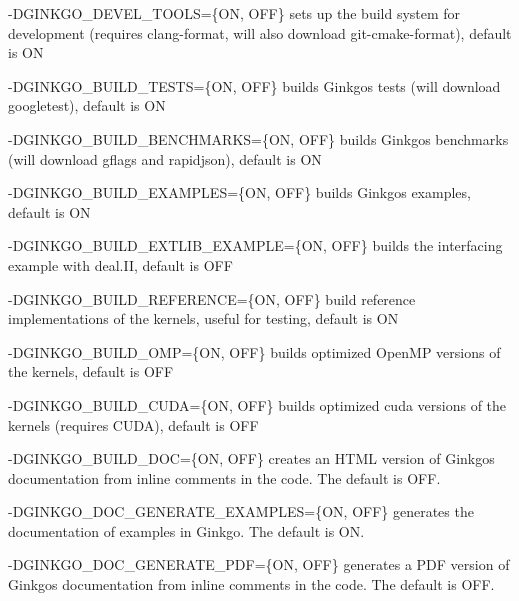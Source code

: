\begin{DoxyItemize}
\item {\ttfamily -\/\+D\+G\+I\+N\+K\+G\+O\+\_\+\+D\+E\+V\+E\+L\+\_\+\+T\+O\+O\+LS=\{ON, O\+FF\}} sets up the build system for development (requires clang-\/format, will also download git-\/cmake-\/format), default is {\ttfamily ON}
\item {\ttfamily -\/\+D\+G\+I\+N\+K\+G\+O\+\_\+\+B\+U\+I\+L\+D\+\_\+\+T\+E\+S\+TS=\{ON, O\+FF\}} builds Ginkgo\textquotesingle{}s tests (will download googletest), default is {\ttfamily ON}
\item {\ttfamily -\/\+D\+G\+I\+N\+K\+G\+O\+\_\+\+B\+U\+I\+L\+D\+\_\+\+B\+E\+N\+C\+H\+M\+A\+R\+KS=\{ON, O\+FF\}} builds Ginkgo\textquotesingle{}s benchmarks (will download gflags and rapidjson), default is {\ttfamily ON}
\item {\ttfamily -\/\+D\+G\+I\+N\+K\+G\+O\+\_\+\+B\+U\+I\+L\+D\+\_\+\+E\+X\+A\+M\+P\+L\+ES=\{ON, O\+FF\}} builds Ginkgo\textquotesingle{}s examples, default is {\ttfamily ON}
\item {\ttfamily -\/\+D\+G\+I\+N\+K\+G\+O\+\_\+\+B\+U\+I\+L\+D\+\_\+\+E\+X\+T\+L\+I\+B\+\_\+\+E\+X\+A\+M\+P\+LE=\{ON, O\+FF\}} builds the interfacing example with deal.\+II, default is {\ttfamily O\+FF}
\item {\ttfamily -\/\+D\+G\+I\+N\+K\+G\+O\+\_\+\+B\+U\+I\+L\+D\+\_\+\+R\+E\+F\+E\+R\+E\+N\+CE=\{ON, O\+FF\}} build reference implementations of the kernels, useful for testing, default is {\ttfamily ON}
\item {\ttfamily -\/\+D\+G\+I\+N\+K\+G\+O\+\_\+\+B\+U\+I\+L\+D\+\_\+\+O\+MP=\{ON, O\+FF\}} builds optimized Open\+MP versions of the kernels, default is {\ttfamily O\+FF}
\item {\ttfamily -\/\+D\+G\+I\+N\+K\+G\+O\+\_\+\+B\+U\+I\+L\+D\+\_\+\+C\+U\+DA=\{ON, O\+FF\}} builds optimized cuda versions of the kernels (requires C\+U\+DA), default is {\ttfamily O\+FF}
\item {\ttfamily -\/\+D\+G\+I\+N\+K\+G\+O\+\_\+\+B\+U\+I\+L\+D\+\_\+\+D\+OC=\{ON, O\+FF\}} creates an H\+T\+ML version of Ginkgo\textquotesingle{}s documentation from inline comments in the code. The default is {\ttfamily O\+FF}.
\item {\ttfamily -\/\+D\+G\+I\+N\+K\+G\+O\+\_\+\+D\+O\+C\+\_\+\+G\+E\+N\+E\+R\+A\+T\+E\+\_\+\+E\+X\+A\+M\+P\+L\+ES=\{ON, O\+FF\}} generates the documentation of examples in Ginkgo. The default is {\ttfamily ON}.
\item {\ttfamily -\/\+D\+G\+I\+N\+K\+G\+O\+\_\+\+D\+O\+C\+\_\+\+G\+E\+N\+E\+R\+A\+T\+E\+\_\+\+P\+DF=\{ON, O\+FF\}} generates a P\+DF version of Ginkgo\textquotesingle{}s documentation from inline comments in the code. The default is {\ttfamily O\+FF}.

\end{DoxyItemize}
